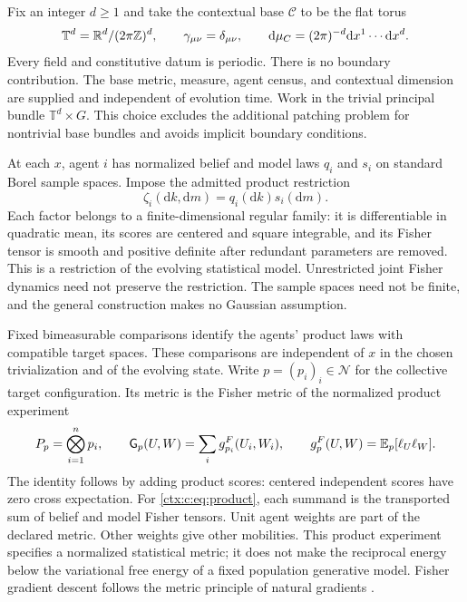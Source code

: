 Fix an integer $d\geq1$ and take the contextual base $\mathcal C$ to be the flat torus
\begin{equation}
 \mathbb T^d=\mathbb R^d/(2\pi\mathbb Z)^d,\qquad
 \gamma_{\mu\nu}=\delta_{\mu\nu},\qquad
 \mathrm d\mu_C=(2\pi)^{-d}\mathrm d x^1\cdots\mathrm d x^d.
 \label{ctx:c:eq:base}
\end{equation}
Every field and constitutive datum is periodic. There is no boundary contribution. The base metric, measure, agent census, and contextual dimension are supplied and independent of evolution time. Work in the trivial principal bundle $\mathbb T^d\times G$. This choice excludes the additional patching problem for nontrivial base bundles and avoids implicit boundary conditions.

At each $x$, agent $i$ has normalized belief and model laws $q_i$ and $s_i$ on standard Borel sample spaces. Impose the admitted product restriction
\begin{equation}
 \zeta_i(\mathrm d k,\mathrm d m)=q_i(\mathrm d k)s_i(\mathrm d m).
 \label{ctx:c:eq:product}
\end{equation}
Each factor belongs to a finite-dimensional regular family: it is differentiable in quadratic mean, its scores are centered and square integrable, and its Fisher tensor is smooth and positive definite after redundant parameters are removed. This is a restriction of the evolving statistical model. Unrestricted joint Fisher dynamics need not preserve the restriction. The sample spaces need not be finite, and the general construction makes no Gaussian assumption.

Fixed bimeasurable comparisons identify the agents' product laws with compatible target spaces. These comparisons are independent of $x$ in the chosen trivialization and of the evolving state. Write $p=(p_i)_i\in\mathcal N$ for the collective target configuration. Its metric is the Fisher metric of the normalized product experiment
\begin{equation}
 P_p=\bigotimes_{i=1}^n p_i,\qquad
 \mathsf G_p(U,W)=\sum_i g^F_{p_i}(U_i,W_i),\qquad
 g^F_p(U,W)=\mathbb E_p[\ell_U\ell_W].
 \label{ctx:c:eq:collective}
\end{equation}
The identity follows by adding product scores: centered independent scores have zero cross expectation. For \cref{ctx:c:eq:product}, each summand is the transported sum of belief and model Fisher tensors. Unit agent weights are part of the declared metric. Other weights give other mobilities. This product experiment specifies a normalized statistical metric; it does not make the reciprocal energy below the variational free energy of a fixed population generative model. Fisher gradient descent follows the metric principle of natural gradients \cite{Amari1998}.

